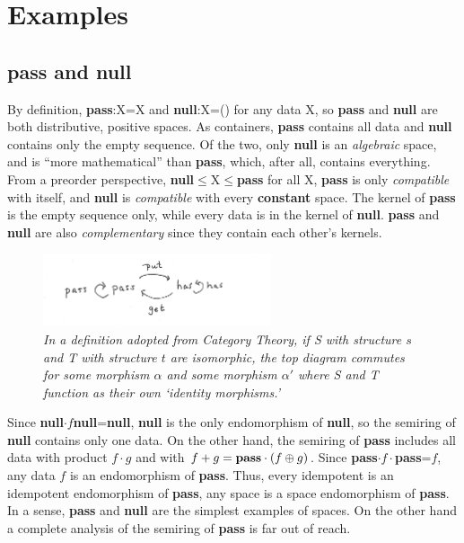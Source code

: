 \documentclass[11pt]{article}
\begin{document}
\section{Examples}

\subsection{{\bf pass} and {\bf null}} 

    By definition, {\bf pass}:X=X and {\bf null}:X=() for any data X, so {\bf pass} and {\bf null} are both distributive, positive spaces.  As containers, {\bf pass} contains all data and {\bf null} contains only the empty sequence.  
Of the two, only {\bf null} is an {\it algebraic} space, and is ``more mathematical'' than {\bf pass}, which, after all, contains everything.  
From a preorder perspective, {\bf null}$\le$X$\le${\bf pass} for all X, {\bf pass} is only {\it compatible} with itself, and {\bf null} is {\it compatible} with every {\bf constant} space.  The kernel of {\bf pass} is the empty sequence only, while every data is in the kernel of {\bf null}.  {\bf pass} and {\bf null} are also 
{\it complementary} since they contain each other's kernels.  

\begin{figure}[h]
\centering
\includegraphics[width=0.6\textwidth]{Pass-has.png}
\caption{{\it In a definition adopted from Category Theory, if S with structure $s$ and T with structure $t$ are isomorphic, the top diagram commutes for some morphism $\alpha$ and some morphism $\alpha'$ where S and T function as their own `identity morphisms.' }}
\end{figure}

Since {\bf null}$\cdot f${\bf null}={\bf null}, {\bf null} is the only endomorphism of {\bf null}, so the semiring of {\bf null} contains only one data. 
On the other hand, the semiring of {\bf pass} includes all data with product $f\cdot g$ and with $f+g={\bf pass} \cdot (f \oplus g)$.  
Since {\bf pass}$\cdot f\cdot ${\bf pass}=$f$, any data $f$ is an endomorphism of {\bf pass}.  
Thus, every idempotent is an idempotent endomorphism of {\bf pass}, any space is a space endomorphism of {\bf pass}.  In a sense, {\bf pass} and {\bf null} are the simplest examples of spaces.  On the other hand a complete 
analysis of the semiring of {\bf pass} is far out of reach.  
\end{document}
